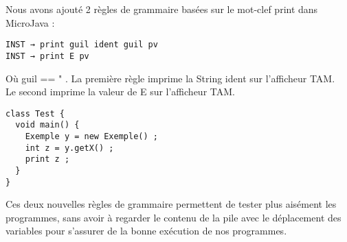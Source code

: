 Nous avons ajouté 2 règles de grammaire basées sur le mot-clef print dans MicroJava : 

\begin{verbatim}
INST → print guil ident guil pv
INST → print E pv
\end{verbatim}

Où guil == " .
La première règle imprime la String ident sur l'afficheur TAM.\\
Le second imprime la valeur de E sur l'afficheur TAM.\\

\begin{verbatim}
class Test {
  void main() {
    Exemple y = new Exemple() ;
    int z = y.getX() ;
    print z ;
  }
}
\end{verbatim}

Ces deux nouvelles règles de grammaire permettent de tester plus aisément les
programmes, sans avoir à regarder le contenu de la pile avec le déplacement des variables
pour s'assurer de la bonne exécution de nos programmes.\\


